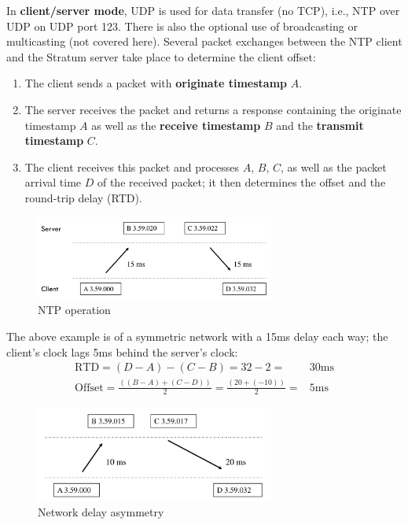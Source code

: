 \documentclass[a4paper,11pt]{article}
\begin{document}
In \textbf{client/server mode}, UDP is used for data transfer (no TCP), i.e., NTP over UDP on UDP port 123.
There is also the optional use of broadcasting or multicasting (not covered here).
Several packet exchanges between the NTP client and the Stratum server take place to determine the client offset:
\begin{enumerate}
    \item   The client sends a packet with \textbf{originate timestamp} $A$.
    \item   The server receives the packet and returns a response containing the originate timestamp $A$ as well as the \textbf{receive timestamp} $B$ and the \textbf{transmit timestamp} $C$.
    \item   The client receives this packet and processes $A$, $B$, $C$, as well as the packet arrival time $D$ of the received packet; it then determines the offset and the round-trip delay (RTD).
\end{enumerate}

\begin{figure}[H]
    \centering
    \includegraphics[width=0.7\textwidth]{./images/ntpoperation.png}
    \caption{ NTP operation }
\end{figure}

The above example is of a symmetric network with a 15ms delay each way; the client's clock lags 5ms behind the server's clock:
\begin{align*}
    \text{RTD}      = (D-A)-(C-B) = 32-2 =& 30\text{ms} \\
    \text{Offset}   = \frac{((B-A)+(C-D))}{2} = \frac{(20 + (-10))}{2} =& 5\text{ms}
\end{align*}

\begin{figure}[H]
    \centering
    \includegraphics[width=0.7\textwidth]{./images/networkdelayasymmetry.png}
    \caption{ Network delay asymmetry }
\end{figure}
\end{document}
